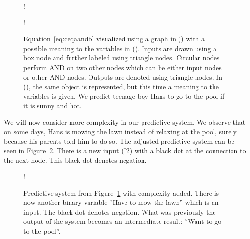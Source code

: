 \begin{figure}[!htb]
    \centering
  \begin{minipage}[b]{.4\linewidth}
    \centering
    \resizebox {0.53\textwidth} {!} {
      
    }
    \label{fig:aig1-num}
  \end{minipage}
  \begin{minipage}[b]{.4\linewidth}
    \centering
    \resizebox {0.7\textwidth} {!} {
      
    }
    \label{fig:aig1-text}
  \end{minipage}
\caption{Equation~\ref{eq:ceqaandb} visualized using a graph in () with a possible meaning to the variables in (). Inputs are drawn using a box node and further labeled using triangle nodes. Circular nodes perform AND on two other nodes which can be either input nodes or other AND nodes. Outputs are denoted using triangle nodes. In (), the same object is represented, but this time a meaning to the variables is given. We predict teenage boy Hans to go to the pool if it is sunny and hot.}
\label{fig:aig1}
\end{figure}
\FloatBarrier

\noindent We will now consider more complexity in our predictive system. We observe that on some days, Hans is mowing the lawn instead of relaxing at the pool, surely because his parents told him to do so. The adjusted predictive system can be seen in Figure~\ref{fig:aig2}. There is a new input (I2) with a black dot at the connection to the next node. This black dot denotes negation.

\begin{figure}[!htb]
    \centering
    \resizebox {0.5\textwidth} {!} {
      
    }
    \caption{Predictive system from Figure~\ref{fig:aig1} with complexity added. There is now another binary variable \enquote{Have to mow the lawn} which is an input. The black dot denotes negation. What was previously the output of the system becomes an intermediate result: \enquote{Want to go to the pool}.}
\label{fig:aig2}
\end{figure}
\FloatBarrier

